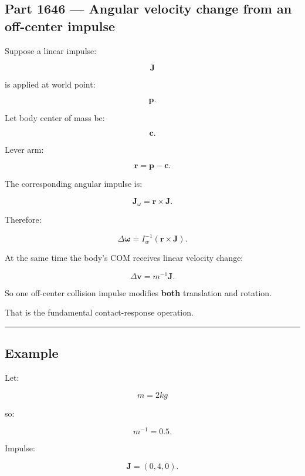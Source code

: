 \subsection{Part 1646 --- Angular velocity change from an off-center impulse}\label{06-engine-ii-ch036-part-1646-angular-velocity-change-from-an-off-center-impulse}

Suppose a linear impulse:

\[
\mathbf J
\]

is applied at world point:

\[
\mathbf p.
\]

Let body center of mass be:

\[
\mathbf c.
\]

Lever arm:

\[
\mathbf r
=
\mathbf p-\mathbf c.
\]

The corresponding angular impulse is:

\[
\boxed{
\mathbf J_\omega
=
\mathbf r\times\mathbf J.
}
\]

Therefore:

\[
\boxed{
\Delta\boldsymbol\omega
=
I_w^{-1}
(
\mathbf r\times\mathbf J
).
}
\]

At the same time the body's COM receives linear velocity change:

\[
\boxed{
\Delta\mathbf v
=
m^{-1}\mathbf J.
}
\]

So one off-center collision impulse modifies \textbf{both} translation and rotation.

That is the fundamental contact-response operation.

\begin{center}\rule{0.5\linewidth}{0.5pt}\end{center}

\begin{allmightroleexample}

\subsection{Example}\label{06-engine-ii-ch036-example}

Let:

\end{allmightroleexample}

\[
m=2kg
\]

so:

\[
m^{-1}=0.5.
\]

Impulse:

\[
\mathbf J=(0,4,0).
\]

